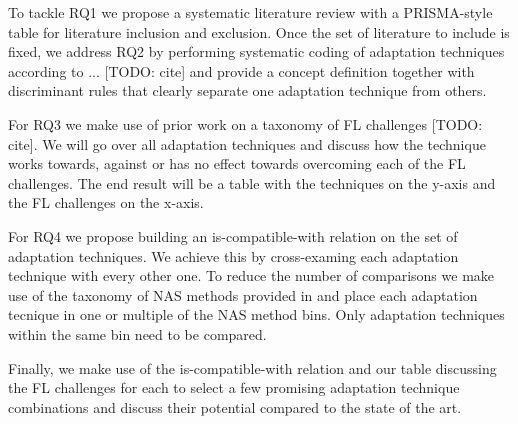 To tackle RQ1 we propose a systematic literature review with a PRISMA-style table for literature inclusion and exclusion. Once the set of literature to include is fixed, we address RQ2 by performing systematic coding of adaptation techniques according to ... [TODO: cite] and provide a concept definition together with discriminant rules that clearly separate one adaptation technique from others. 

For RQ3 we make use of prior work on a taxonomy of FL challenges [TODO: cite]. We will go over all adaptation techniques and discuss how the technique works towards, against or has no effect towards overcoming each of the FL challenges. The end result will be a table with the techniques on the y-axis and the FL challenges on the x-axis.

For RQ4 we propose building an is-compatible-with relation on the set of adaptation techniques. We achieve this by cross-examing each adaptation technique with every other one. To reduce the number of comparisons we make use of the taxonomy of NAS methods provided in \cite{nas_1000_papers_2023} and place each adaptation tecnique in one or multiple of the NAS method bins. Only adaptation techniques within the same bin need to be compared.

Finally, we make use of the is-compatible-with relation and our table discussing the FL challenges for each to select a few promising adaptation technique combinations and discuss their potential compared to the state of the art.